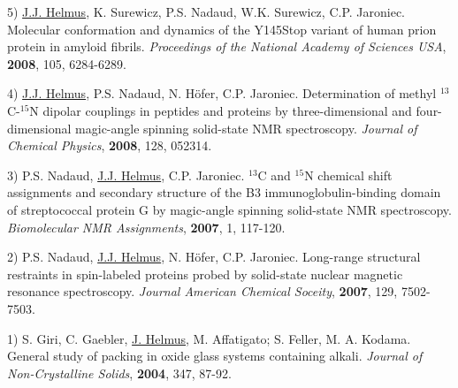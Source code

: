 \documentclass[margin,line]{res}
\begin{document}
\begin{resume}
5) \underline{J.J. Helmus}, K. Surewicz, P.S. Nadaud, W.K. Surewicz, C.P. Jaroniec.
Molecular conformation and dynamics of the Y145Stop variant of human prion protein in
amyloid fibrils.
{\em Proceedings of the National Academy of Sciences USA}, {\bf 2008}, 105, 6284-6289.

4) \underline{J.J. Helmus}, P.S. Nadaud, N. H\"{o}fer, C.P. Jaroniec.
Determination of methyl $^{13}$C-$^{15}$N dipolar couplings in peptides and proteins by
three-dimensional and four-dimensional magic-angle spinning solid-state NMR spectroscopy.
{\em Journal of  Chemical Physics}, {\bf 2008}, 128, 052314.

3) P.S. Nadaud, \underline{J.J. Helmus}, C.P. Jaroniec.
$^{13}$C and $^{15}$N chemical shift assignments and secondary structure of the
B3 immunoglobulin-binding domain of streptococcal protein G by magic-angle spinning
solid-state NMR spectroscopy.
{\em Biomolecular NMR Assignments}, {\bf 2007}, 1, 117-120.

2) P.S. Nadaud, \underline{J.J. Helmus}, N. H\"{o}fer, C.P. Jaroniec.
Long-range structural restraints in spin-labeled proteins probed by solid-state nuclear magnetic
resonance spectroscopy.
{\em Journal American Chemical Soceity}, {\bf 2007}, 129, 7502-7503.

1) S. Giri, C. Gaebler, \underline{J. Helmus}, M. Affatigato; S. Feller, M. A. Kodama.
General study of packing in oxide glass systems containing alkali.
{\em Journal of Non-Crystalline Solids}, {\bf 2004}, 347, 87-92.


\end{resume}
\end{document}
